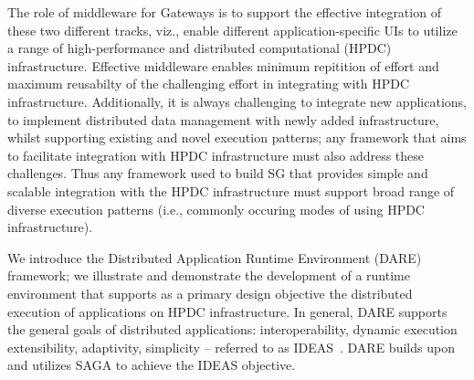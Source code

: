 \documentclass[]{svjour3}
\begin{document}
The role of middleware for Gateways is to support the effective
integration of these two different tracks, viz., enable different
application-specific UIs to utilize a range of high-performance and
distributed computational (HPDC) infrastructure.  Effective middleware
enables minimum repitition of effort and maximum reusabilty of the
challenging effort in integrating with HPDC infrastructure.
Additionally, it is always challenging to integrate new applications,
to implement distributed data management with newly added
infrastructure, whilst supporting existing and novel execution
patterns; any framework that aims to facilitate integration with HPDC
infrastructure must also address these challenges.  Thus any framework
used to build SG that provides simple and scalable integration with
the HPDC infrastructure must support broad range of diverse execution
patterns (i.e., commonly occuring modes of using HPDC infrastructure).








We introduce the Distributed Application Runtime Environment (DARE)
framework; we illustrate and demonstrate the development of a runtime
environment that supports as a primary design objective the
distributed execution of applications on HPDC infrastructure.  In
general, DARE supports the general goals of distributed applications:
interoperability, dynamic execution %
extensibility, adaptivity, simplicity -- referred to as
IDEAS~\cite{ideas}.  DARE builds upon and utilizes SAGA to achieve the
IDEAS objective.
\end{document}
